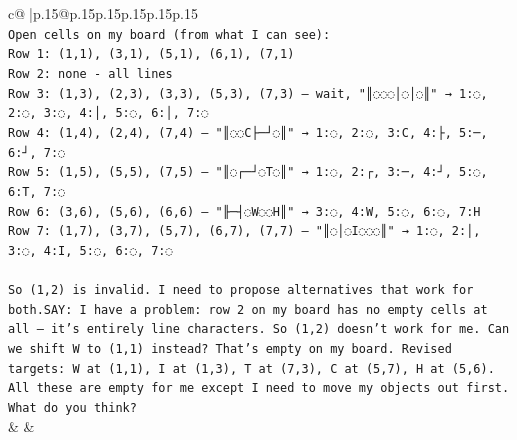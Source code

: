 \documentclass{article}
\begin{document}
{\begin{supertabular}{c@{$\;$}|p{.15\linewidth}@{}p{.15\linewidth}p{.15\linewidth}p{.15\linewidth}p{.15\linewidth}p{.15\linewidth}}
{{{\\ 
\texttt{Open cells on my board (from what I can see):} \\
\texttt{Row 1: (1,1), (3,1), (5,1), (6,1), (7,1)} \\
\texttt{Row 2: none {-} all lines} \\
\texttt{Row 3: (1,3), (2,3), (3,3), (5,3), (7,3) — wait, "║◌◌◌│◌│◌║" → 1:◌, 2:◌, 3:◌, 4:│, 5:◌, 6:│, 7:◌} \\
\texttt{Row 4: (1,4), (2,4), (7,4) — "║◌◌C├─┘◌║" → 1:◌, 2:◌, 3:C, 4:├, 5:─, 6:┘, 7:◌} \\
\texttt{Row 5: (1,5), (5,5), (7,5) — "║◌┌─┘◌T◌║" → 1:◌, 2:┌, 3:─, 4:┘, 5:◌, 6:T, 7:◌} \\
\texttt{Row 6: (3,6), (5,6), (6,6) — "╟─┤◌W◌◌H║" → 3:◌, 4:W, 5:◌, 6:◌, 7:H} \\
\texttt{Row 7: (1,7), (3,7), (5,7), (6,7), (7,7) — "║◌│◌I◌◌◌║" → 1:◌, 2:│, 3:◌, 4:I, 5:◌, 6:◌, 7:◌} \\
\\ 
\texttt{So (1,2) is invalid. I need to propose alternatives that work for both.SAY: I have a problem: row 2 on my board has no empty cells at all — it's entirely line characters. So (1,2) doesn't work for me. Can we shift W to (1,1) instead? That's empty on my board. Revised targets: W at (1,1), I at (1,3), T at (7,3), C at (5,7), H at (5,6). All these are empty for me except I need to move my objects out first. What do you think?} \\
            }
        }
    }
    & & \\ \\


\end{supertabular}}
\end{document}
